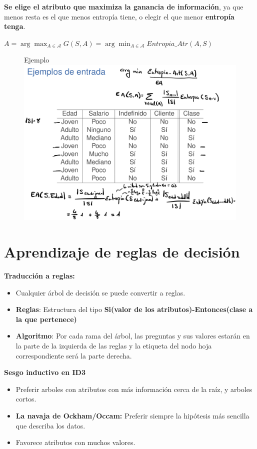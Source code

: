 \documentclass[12pt]{report} %
\begin{document}
\textbf{Se elige el atributo que maximiza la ganancia de información},
ya que menos resta es el que menos entropía tiene, o elegir el que menor
\textbf{entropía tenga}.

\(A= \arg\max_{A \in \mathcal{A}} G(S,A) = \arg\min_{A \in \mathcal{A}} Entropia \_ Atr(A,S)\)


\begin{figure}[H]
	Ejemplo
	{\includegraphics[scale=.1]{Untitled 10.png}}
\end{figure}


\section{Aprendizaje de reglas de
decisión}

\textbf{Traducción a reglas:}

\begin{itemize}
\item
  Cualquier árbol de decisión se puede convertir a reglas.
\item
  \textbf{Reglas}: Estructura del tipo \textbf{Si(valor de los
  atributos)-Entonces(clase a la que pertenece)}
\item
  \textbf{Algoritmo}: Por cada rama del árbol, las preguntas y sus
  valores estarán en la parte de la izquierda de las reglas y la
  etiqueta del nodo hoja correspondiente será la parte derecha.
\end{itemize}

\textbf{Sesgo inductivo en ID3}

\begin{itemize}
\item
  Preferir arboles con atributos con más información cerca de la raíz, y
  arboles cortos.
\item
  \textbf{La navaja de Ockham/Occam:} Preferir siempre la hipótesis más
  sencilla que describa los datos.
\item
  Favorece atributos con muchos valores.
\end{itemize}
\end{document}
